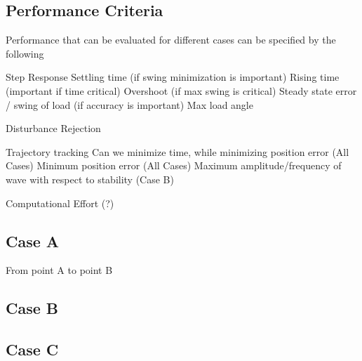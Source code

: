 \subsection{Performance Criteria}
Performance  that can be evaluated for different cases can be specified by the following
\begin{outline}
	\1 Step Response
	\2 Settling time (if swing minimization is important)
	\2 Rising time (important if time critical)
	\2 Overshoot (if max swing is critical)
	\2 Steady state error / swing of load (if accuracy is important)
	\2 Max load angle
	
	\1 Disturbance Rejection
	
	\1 Trajectory tracking
	\2 Can we minimize time, while minimizing position error (All Cases)
	\2 Minimum position error (All Cases)
	\2 Maximum amplitude/frequency of wave with respect to stability (Case B)
	
	\1 Computational Effort (?)
\end{outline}


\subsection{Case A}

From point A to point B


\subsection{Case B}


\subsection{Case C}


